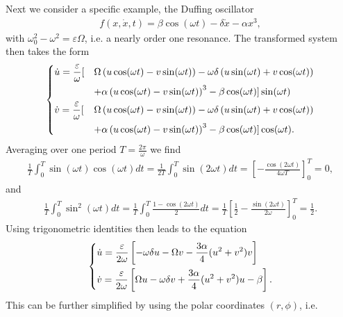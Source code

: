 \begin{ex}
Next we consider a specific example, the Duffing oscillator
\begin{align}
	f(x, \dot{x}, t) = \beta \cos(\omega t) - \delta \dot{x} - \alpha x^3,
\end{align}
with $\omega_0^2-\omega^2 = \varepsilon \Omega$, i.e. a nearly order one resonance. The transformed system then takes the form
\begin{align}
	\begin{dcases}
		\dot{u} = \frac{\varepsilon}{\omega } [ &\Omega \left( u \cos(\omega t) - v \sin (\omega t)\right) - \omega \delta \left( u \sin(\omega t) + v \cos (\omega t)\right)  \\
							    &+\alpha \left(u \cos(\omega t) - v \sin (\omega t)\right) ^{3} - \beta \cos(\omega t)  ] \sin(\omega t)
\\
		\dot{v} = \frac{\varepsilon}{\omega } [ &\Omega \left( u \cos(\omega t) - v \sin (\omega t)\right) - \omega \delta \left( u \sin(\omega t) + v \cos (\omega t)\right)  \\
							    &+\alpha \left(u \cos(\omega t) - v \sin (\omega t)\right) ^{3} - \beta \cos(\omega t)  ] \cos(\omega t).
	\end{dcases}
\end{align}
Averaging over one period $T = \frac{2 \pi }{\omega }$ we find
\begin{align}
	\frac{1}{T} \int_{0}^{T} \sin(\omega t) \cos(\omega t) dt = \frac{1}{2T}\int_{0}^{T} \sin(2\omega t) dt = \left[ - \frac{\cos (2 \omega t)}{4 \omega T} \right]_{0}^{T} = 0,
\end{align}
and
\begin{align}
	\frac{1}{T}\int_{0}^{T} \sin^2 (\omega t) dt = \frac{1}{T} \int_{0}^{T} \frac{1-\cos(2\omega t)}{2} dt = \frac{1}{T} \left[ \frac{1}{2} - \frac{\sin (2 \omega t)}{2 \omega} \right]_{0}^{T} = \frac{1}{2}.
\end{align}
Using trigonometric identities then leads to the equation
\begin{align}
	\begin{dcases}
		\dot{u} = \frac{\varepsilon}{2 \omega }\left[ - \omega \delta u - \Omega v - \frac{3 \alpha }{4} ( u^2 + v^2) v\right] \\
		\dot{v} = \frac{\varepsilon}{2 \omega } \left[ \Omega u - \omega \delta v + \frac{3 \alpha}{4} (u^2 + v^2) u - \beta \right].
	\end{dcases}
\end{align}
This can be further simplified by using the polar coordinates $(r, \phi)$, i.e. 
\begin{align}

\end{align}
\end{ex}
